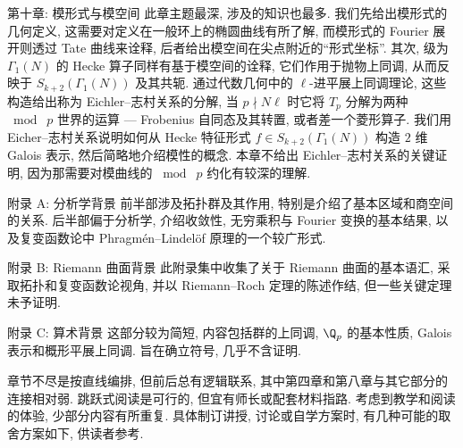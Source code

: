 \begin{asparadesc}
	\item[第十章: 模形式与模空间] 此章主题最深, 涉及的知识也最多. 我们先给出模形式的几何定义, 这需要对定义在一般环上的椭圆曲线有所了解, 而模形式的 Fourier 展开则透过 Tate 曲线来诠释, 后者给出模空间在尖点附近的``形式坐标''. 其次, 级为 $\Gamma_1(N)$ 的 Hecke 算子同样有基于模空间的诠释, 它们作用于抛物上同调, 从而反映于 $S_{k+2}(\Gamma_1(N))$ 及其共轭. 通过代数几何中的 $\ell$-进平展上同调理论, 这些构造给出称为 Eichler--志村关系的分解, 当 $p \nmid N\ell$ 时它将 $T_p$ 分解为两种 $\bmod\; p$ 世界的运算 --- Frobenius 自同态及其转置, 或者差一个菱形算子. 我们用 Eicher--志村关系说明如何从 Hecke 特征形式 $f \in S_{k+2}(\Gamma_1(N))$ 构造 $2$ 维 Galois 表示, 然后简略地介绍模性的概念. 本章不给出 Eichler--志村关系的关键证明, 因为那需要对模曲线的 $\bmod\;p$ 约化有较深的理解.

	\item[附录 A: 分析学背景] 前半部涉及拓扑群及其作用, 特别是介绍了基本区域和商空间的关系. 后半部偏于分析学, 介绍收敛性, 无穷乘积与 Fourier 变换的基本结果, 以及复变函数论中 Phragmén--Lindelöf 原理的一个较广形式.

	\item[附录 B: Riemann 曲面背景] 此附录集中收集了关于 Riemann 曲面的基本语汇, 采取拓扑和复变函数论视角, 并以 Riemann--Roch 定理的陈述作结, 但一些关键定理未予证明.

	\item[附录 C: 算术背景] 这部分较为简短, 内容包括群的上同调, $\Q_p$ 的基本性质, Galois 表示和概形平展上同调. 旨在确立符号, 几乎不含证明.

\end{asparadesc}

章节不尽是按直线编排, 但前后总有逻辑联系, 其中第四章和第八章与其它部分的连接相对弱. 跳跃式阅读是可行的, 但宜有师长或配套材料指路. 考虑到教学和阅读的体验, 少部分内容有所重复. 具体制订讲授, 讨论或自学方案时, 有几种可能的取舍方案如下, 供读者参考.

